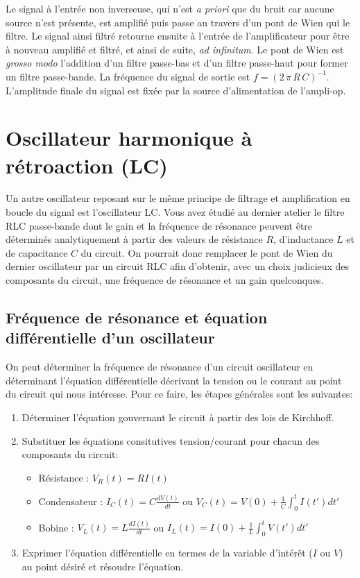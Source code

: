\documentclass[canadien,12pt,oneside,letterpaper]{article}
\begin{document}
Le signal à l'entrée non inverseuse, qui n'est \textit{a priori} que du bruit car aucune source n'est présente, est amplifié puis passe au travers d'un pont de Wien qui le filtre. Le signal ainsi filtré retourne ensuite à l'entrée de l'amplificateur pour être à nouveau amplifié et filtré, et ainsi de suite, \textit{ad infinitum}. Le pont de Wien est \textit{grosso modo} l'addition d'un filtre passe-bas et d'un filtre passe-haut pour former un filtre passe-bande. La fréquence du signal de sortie est $f=\left(2\,\pi\,R\,C\right)^{-1}$. L'amplitude finale du signal est fixée par la source d'alimentation de l'ampli-op. %

\section{Oscillateur harmonique à rétroaction (LC)}
Un autre oscillateur reposant sur le même principe de filtrage et amplification en boucle du signal est l'oscillateur LC. Vous avez étudié au dernier atelier le filtre RLC passe-bande dont le gain et la fréquence de résonance peuvent être déterminés analytiquement à partir des valeurs de résistance $R$, d'inductance $L$ et de capacitance $C$ du circuit. On pourrait donc remplacer le pont de Wien du dernier oscillateur par un circuit RLC afin d'obtenir, avec un choix judicieux des composants du circuit, une fréquence de résonance et un gain quelconques. 
\subsection{Fréquence de résonance et équation différentielle d'un oscillateur}
On peut déterminer la fréquence de résonance d'un circuit oscillateur en déterminant l'équation différentielle décrivant la tension ou le courant au point du circuit qui nous intéresse. Pour ce faire, les étapes générales sont les suivantes:
\begin{enumerate}
    \item Déterminer l'équation gouvernant le circuit à partir des lois de Kirchhoff.
    \item Substituer les équations consitutives tension/courant pour chacun des composants du circuit:
    \begin{itemize}
        \item Résistance : $V_R(t) = RI(t)$
        \item Condensateur : $I_C(t) = C\frac{dV(t)}{dt}$ ou $V_C(t) = V(0)+\frac{1}{C}\int_0^tI(t')dt'$
        \item Bobine : $V_L(t) = L\frac{dI(t)}{dt}$ ou $I_L(t) = I(0)+\frac{1}{L}\int_0^tV(t')dt'$
    \end{itemize}
    \item Exprimer l'équation différentielle en termes de la variable d'intérêt ($I$ ou $V$) au point désiré et résoudre l'équation.
\end{enumerate}
\end{document}
